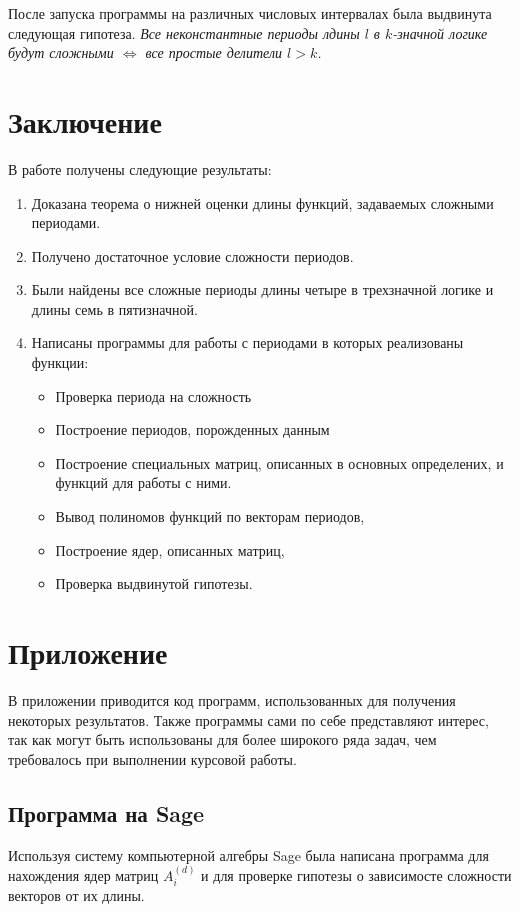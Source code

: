 \documentclass[bibliography=totoc, a4paper, 14pt]{extarticle}
\let\stdsection\section
\renewcommand\section{\newpage\stdsection}
\begin{document}
После запуска программы на различных числовых интервалах была выдвинута следующая гипотеза.
\emph{Все неконстантные периоды лдины $l$ в $k$\nobreakdash-значной логике будут сложными $\Leftrightarrow$
все простые делители $l > k$.}

\section{Заключение}
В работе получены следующие результаты:
\begin{enumerate}
\item Доказана теорема о нижней оценки длины функций, задаваемых сложными периодами.

\item Получено достаточное условие сложности периодов.

\item Были найдены все сложные периоды длины четыре в трехзначной логике и длины семь в пятизначной.

\item Написаны программы для работы с периодами в которых реализованы функции:
\begin{itemize}
\item Проверка периода на сложность
\item Построение периодов, порожденных данным
\item Построение специальных матриц, описанных в основных определених,
и функций для работы с ними.
\item Вывод полиномов функций по векторам периодов,
\item Построение ядер, описанных матриц,
\item Проверка выдвинутой гипотезы.
\end{itemize}
\end{enumerate}


\section{Приложение}

В приложении приводится код программ, использованных для получения некоторых результатов. Также программы
сами по себе представляют интерес, так как могут быть использованы для более широкого ряда задач,
чем требовалось при выполнении курсовой работы.

\subsection{Программа на Sage} \label{sub:sage}
Используя систему компьютерной алгебры {S}age\cite{sage} была написана программа для нахождения
ядер матриц $A_i^{(d)}$ и для проверке гипотезы о зависимосте сложности векторов от их длины.
\end{document}
